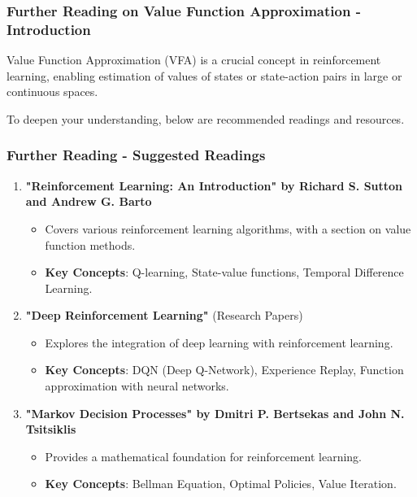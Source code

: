 \documentclass[aspectratio=169]{beamer}
\begin{document}
\begin{frame}[fragile]
  \frametitle{Further Reading on Value Function Approximation - Introduction}
  Value Function Approximation (VFA) is a crucial concept in reinforcement learning, enabling estimation of values of states or state-action pairs in large or continuous spaces.

  To deepen your understanding, below are recommended readings and resources.
\end{frame}

\begin{frame}[fragile]
  \frametitle{Further Reading - Suggested Readings}
  \begin{enumerate}
    \item \textbf{"Reinforcement Learning: An Introduction" by Richard S. Sutton and Andrew G. Barto}
      \begin{itemize}
        \item Covers various reinforcement learning algorithms, with a section on value function methods.
        \item \textbf{Key Concepts}: Q-learning, State-value functions, Temporal Difference Learning.
      \end{itemize}
      
    \item \textbf{"Deep Reinforcement Learning"} (Research Papers)
      \begin{itemize}
        \item Explores the integration of deep learning with reinforcement learning.
        \item \textbf{Key Concepts}: DQN (Deep Q-Network), Experience Replay, Function approximation with neural networks.
      \end{itemize}
      
    \item \textbf{"Markov Decision Processes" by Dmitri P. Bertsekas and John N. Tsitsiklis}
      \begin{itemize}
        \item Provides a mathematical foundation for reinforcement learning.
        \item \textbf{Key Concepts}: Bellman Equation, Optimal Policies, Value Iteration.
      \end{itemize}
  \end{enumerate}
\end{frame}
\end{document}
